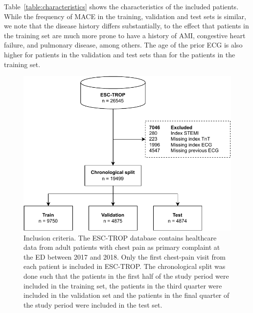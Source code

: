 \documentclass[preprint]{elsarticle}
\begin{document}
Table~\ref{table:characteristics} shows the characteristics of the included patients. While the frequency of MACE in the training, validation and test sets is similar, we note that the disease history differs substantially, to the effect that patients in the training set are much more prone to have a history of AMI, congestive heart failure, and pulmonary disease, among others. The age of the prior ECG is also higher for patients in the validation and test sets than for the patients in the training set.

\begin{figure}[h!]
\includegraphics[width=\linewidth]{figures/inclusioncriteria.pdf}
\centering
\caption{Inclusion criteria. The ESC-TROP database contains healthcare data from adult patients with chest pain as primary complaint at the ED between 2017 and 2018. Only the first chest-pain visit from each patient is included in ESC-TROP. The chronological split was done such that the patients in the first half of the study period were included in the training set, the patients in the third quarter were included in the validation set and the patients in the final quarter of the study period were included in the test set.}
\label{fig:inclusion}
\end{figure}
\end{document}
